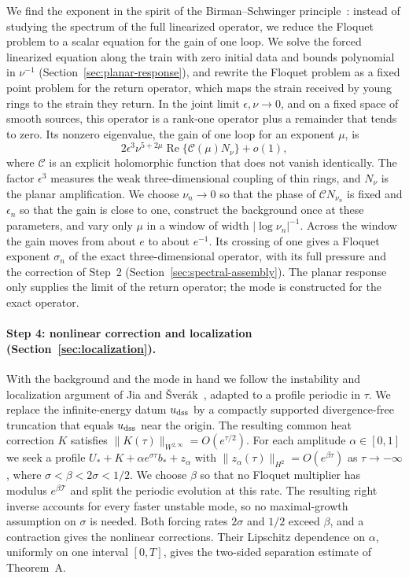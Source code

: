 \documentclass[11pt]{article}
\numberwithin{equation}{section}
\theoremstyle{definition}
\theoremstyle{remark}
\theoremstyle{plain}
\begin{document}
We find the exponent in the spirit of the Birman--Schwinger
principle~\cite{birman1961,schwinger1961}: instead of studying the
spectrum of the full linearized operator, we reduce the Floquet problem to
a scalar equation for the gain of one loop. We solve the forced
linearized equation along the train with zero initial data and bounds polynomial in
$\nu^{-1}$ (Section~\ref{sec:planar-response}), and rewrite the Floquet
problem as a fixed point problem for the return operator, which maps the
strain received by young rings to the strain they return. In the joint
limit $\epsilon,\nu\to0$, and on a fixed space of smooth sources, this
operator is a rank-one operator plus a remainder that tends to zero. Its
nonzero eigenvalue, the gain of one loop for an exponent $\mu$, is
\[
 2\epsilon^3\nu^{5+2\mu}\operatorname{Re}\{\mathcal C(\mu)N_\nu\}+o(1),
\]
where $\mathcal C$ is an explicit holomorphic function that does not
vanish identically. The factor $\epsilon^3$ measures the weak
three-dimensional coupling of thin rings, and $N_\nu$ is the planar
amplification. We choose $\nu_n\to0$ so that the phase of
$\mathcal C N_{\nu_n}$ is fixed and $\epsilon_n$ so that the gain is
close to one, construct the background once at these parameters, and vary
only $\mu$ in a window of width $|\log\nu_n|^{-1}$. Across the window the
gain moves from about $e$ to about $e^{-1}$. Its crossing of one gives a
Floquet exponent $\sigma_n$ of the exact three-dimensional operator, with
its full pressure and the correction of Step~2
(Section~\ref{sec:spectral-assembly}). The planar response only supplies
the limit of the return operator; the mode is constructed for the exact
operator.

\paragraph{Step 4: nonlinear correction and localization
(Section~\ref{sec:localization}).}
With the background and the mode in hand we follow the instability and
localization argument of Jia and \v Sver\'ak~\cite{jia-sverak2015},
adapted to a profile periodic in $\tau$. We replace the infinite-energy
datum $u_{\rm dss}$ by a compactly supported divergence-free truncation
that equals $u_{\rm dss}$ near the origin. The resulting common heat
correction $K$ satisfies $\|K(\tau)\|_{W^{2,\infty}}=O(e^{\tau/2})$.
For each amplitude $\alpha\in[0,1]$ we seek a profile
$U_*+K+\alpha e^{\sigma\tau}b_*+z_\alpha$ with
$\|z_\alpha(\tau)\|_{H^2}=O(e^{\beta\tau})$ as $\tau\to-\infty$,
where $\sigma<\beta<2\sigma<1/2$. We choose $\beta$ so that no Floquet
multiplier has modulus $e^{\beta\mathcal T}$ and split the periodic
evolution at this rate. The resulting right inverse accounts for every
faster unstable mode, so no maximal-growth assumption on $\sigma$ is
needed. Both forcing rates $2\sigma$ and $1/2$ exceed $\beta$, and a
contraction gives the nonlinear corrections. Their Lipschitz dependence
on $\alpha$, uniformly on one interval $[0,T]$, gives the two-sided
separation estimate of Theorem~A.
\end{document}
